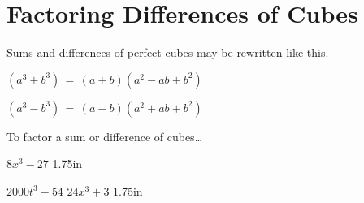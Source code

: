 
\section{Factoring Differences of Cubes}

Sums and differences of perfect cubes may be rewritten 
like this.
\begin{tcbraster}[
    raster columns = 2,
    raster equal height,
    raster left skip=2em, raster right skip=2em, 
    raster column skip=4em,
    valign=center,
]
\begin{tcolorbox}
    \centering
    \large
    $
        (a^3 + b^3) \,=\, (a+b)(a^2 - ab + b^2)
    $
\end{tcolorbox}
%
\begin{tcolorbox} 
    \centering
    \large
    $
        (a^3 - b^3) \,=\, (a-b)(a^2 + ab + b^2)
    $
\end{tcolorbox}
\end{tcbraster}


\begin{myConceptSteps}{To factor a sum or difference of cubes\dots}
\end{myConceptSteps}



    {
        $ 8x^3 - 27 $
    }
    {1.75in}

\myProblems
{
    $ 2000t^3 - 54 $
}
{
    $ 24x^3 + 3 $
}
{1.75in}

